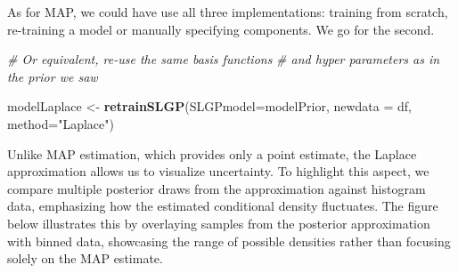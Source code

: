 \documentclass[
]{article}
\newenvironment{Shaded}{\begin{snugshade}}{\end{snugshade}}
\newcommand{\AttributeTok}[1]{\textcolor[rgb]{0.13,0.29,0.53}{#1}}
\newcommand{\CommentTok}[1]{\textcolor[rgb]{0.56,0.35,0.01}{\textit{#1}}}
\newcommand{\FunctionTok}[1]{\textcolor[rgb]{0.13,0.29,0.53}{\textbf{#1}}}
\newcommand{\NormalTok}[1]{#1}
\newcommand{\OtherTok}[1]{\textcolor[rgb]{0.56,0.35,0.01}{#1}}
\newcommand{\StringTok}[1]{\textcolor[rgb]{0.31,0.60,0.02}{#1}}
\begin{document}
As for MAP, we could have use all three implementations: training from scratch, re-training a model or manually specifying components. We go for the second.

\begin{Shaded}
\begin{Highlighting}[]
\CommentTok{\# Or equivalent, re{-}use the same basis functions }
\CommentTok{\# and hyper parameters as in the prior we saw}

\NormalTok{modelLaplace }\OtherTok{\textless{}{-}} \FunctionTok{retrainSLGP}\NormalTok{(}\AttributeTok{SLGPmodel=}\NormalTok{modelPrior, }
                            \AttributeTok{newdata =}\NormalTok{ df, }
                            \AttributeTok{method=}\StringTok{"Laplace"}\NormalTok{)}
\end{Highlighting}
\end{Shaded}

Unlike MAP estimation, which provides only a point estimate, the Laplace approximation allows us to visualize uncertainty. To highlight this aspect, we compare multiple posterior draws from the approximation against histogram data, emphasizing how the estimated conditional density fluctuates. The figure below illustrates this by overlaying samples from the posterior approximation with binned data, showcasing the range of possible densities rather than focusing solely on the MAP estimate.
\end{document}
